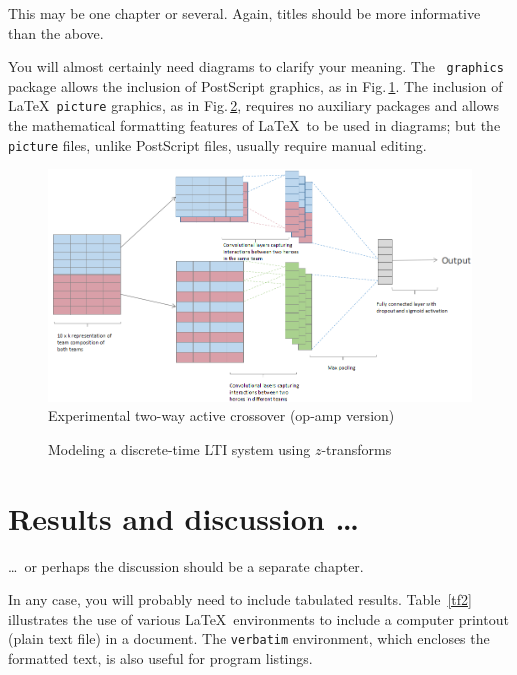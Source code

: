 \documentclass[12pt,openany,a4paper]{book}
\newcommand{\fig}[1]  {Fig.\,\ref{#1}}		%
\newcommand{\tab}[1]  {Table~\ref{#1}}		%
\begin{document}
This may be one chapter or several.  Again, titles should be more
informative than the above.

You will almost certainly need diagrams to clarify your meaning.  The
\LaTeXe\ \texttt{graphics} package allows the inclusion of PostScript
graphics, as in \fig{flr1}.  The inclusion of \LaTeX\ \texttt{picture}
graphics, as in \fig{fzsys}, requires no auxiliary packages and allows
the mathematical formatting features of \LaTeX\ to be used in
diagrams; but the \texttt{picture} files, unlike PostScript files,
usually require manual editing.

\begin{figure}[htbp]
\centerline{\includegraphics{architecture.png}}
\caption{Experimental two-way active crossover (op-amp version)}
\label{flr1}
\end{figure}

\begin{figure}[htbp]
\caption{Modeling a discrete-time LTI system using $z$-transforms}
\label{fzsys}
\end{figure}

\chapter{Results and discussion \ldots}

\ldots\ or perhaps the discussion should be a separate chapter.

In any case, you will probably need to include tabulated results.
\tab{tf2} illustrates the use of various \LaTeX\ environments to
include a computer printout (plain text file) in a document.  The
\texttt{verbatim} environment, which encloses the formatted text, is
also useful for program listings.
\end{document}
